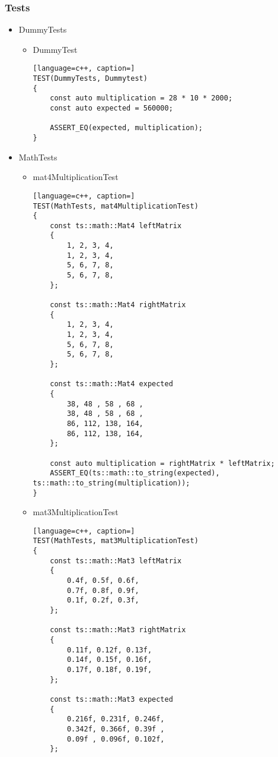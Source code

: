 \subsubsection{Tests}
\begin{itemize}
    \item DummyTests
        \begin{itemize}
            \item DummyTest
            \begin{lstlisting}[language=c++, caption=]
TEST(DummyTests, Dummytest)
{
    const auto multiplication = 28 * 10 * 2000;
    const auto expected = 560000;

    ASSERT_EQ(expected, multiplication);
}
            \end{lstlisting}
        \end{itemize}
    \item MathTests
        \begin{itemize}
            \item mat4MultiplicationTest
            \begin{lstlisting}[language=c++, caption=]
TEST(MathTests, mat4MultiplicationTest)
{
    const ts::math::Mat4 leftMatrix
    {
        1, 2, 3, 4,
        1, 2, 3, 4,
        5, 6, 7, 8,
        5, 6, 7, 8,
    };

    const ts::math::Mat4 rightMatrix
    {
        1, 2, 3, 4,
        1, 2, 3, 4,
        5, 6, 7, 8,
        5, 6, 7, 8,
    };

    const ts::math::Mat4 expected
    {
        38, 48 , 58 , 68 ,
        38, 48 , 58 , 68 ,
        86, 112, 138, 164,
        86, 112, 138, 164,
    };

    const auto multiplication = rightMatrix * leftMatrix;
    ASSERT_EQ(ts::math::to_string(expected), ts::math::to_string(multiplication));
}
            \end{lstlisting}
            \item mat3MultiplicationTest
            \begin{lstlisting}[language=c++, caption=]
TEST(MathTests, mat3MultiplicationTest)
{
    const ts::math::Mat3 leftMatrix
    {
        0.4f, 0.5f, 0.6f,
        0.7f, 0.8f, 0.9f,
        0.1f, 0.2f, 0.3f,
    };

    const ts::math::Mat3 rightMatrix
    {
        0.11f, 0.12f, 0.13f,
        0.14f, 0.15f, 0.16f,
        0.17f, 0.18f, 0.19f,
    };

    const ts::math::Mat3 expected
    {
        0.216f, 0.231f, 0.246f,
        0.342f, 0.366f, 0.39f ,
        0.09f , 0.096f, 0.102f,
    };


\end{lstlisting}
\end{itemize}
\end{itemize}
